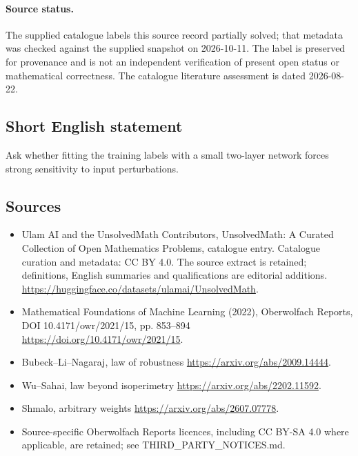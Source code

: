 \documentclass[11pt]{article}
\begin{document}
\paragraph{Source status.}
The supplied catalogue labels this source record partially solved; that metadata was checked against the supplied snapshot on 2026-10-11. The label is preserved for provenance and is not an independent verification of present open status or mathematical correctness. The catalogue literature assessment is dated 2026-08-22.
\subsection{Short English statement}
Ask whether fitting the training labels with a small two-layer network forces strong sensitivity to input perturbations.
\subsection{Sources}
\begin{itemize}
\item[\hypertarget{source:statement:1}{S1}] Ulam AI and the UnsolvedMath Contributors, UnsolvedMath: A Curated Collection of Open Mathematics Problems, catalogue entry. Catalogue curation and metadata: CC BY 4.0. The source extract is retained; definitions, English summaries and qualifications are editorial additions.
\url{https://huggingface.co/datasets/ulamai/UnsolvedMath}.
\item[\hypertarget{source:statement:2}{S2}] Mathematical Foundations of Machine Learning (2022), Oberwolfach Reports, DOI 10.4171/owr/2021/15, pp. 853--894
\url{https://doi.org/10.4171/owr/2021/15}.
\item[\hypertarget{source:statement:3}{S3}] Bubeck--Li--Nagaraj, law of robustness
\url{https://arxiv.org/abs/2009.14444}.
\item[\hypertarget{source:statement:4}{S4}] Wu--Sahai, law beyond isoperimetry
\url{https://arxiv.org/abs/2202.11592}.
\item[\hypertarget{source:statement:5}{S5}] Shmalo, arbitrary weights
\url{https://arxiv.org/abs/2607.07778}.
\item Source-specific Oberwolfach Reports licences, including CC BY-SA 4.0 where applicable, are retained; see THIRD\_PARTY\_NOTICES.md.
\end{itemize}
\end{document}
